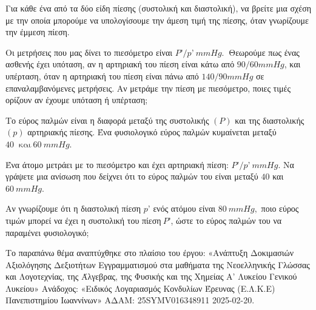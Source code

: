 \begin{alist}
\item Για κάθε ένα από τα δύο είδη πίεσης (συστολική και διαστολική), να βρείτε μια σχέση με την οποία μπορούμε να υπολογίσουμε την άμεση τιμή της πίεσης, όταν γνωρίζουμε την έμμεση πίεση.
\item Οι μετρήσεις που μας δίνει το πιεσόμετρο είναι $P’/p’\ \si{mmHg}.\ $ Θεωρούμε πως ένας ασθενής έχει υπόταση, αν η αρτηριακή του πίεση είναι κάτω από $90/60 \si{mmHg}$, και υπέρταση, όταν η αρτηριακή του πίεση είναι πάνω από $140/90 \si{mmHg}$ σε επαναλαμβανόμενες μετρήσεις. Αν μετράμε την πίεση με πιεσόμετρο, ποιες τιμές ορίζουν αν έχουμε υπόταση ή υπέρταση;

\item Το εύρος παλμών είναι η διαφορά μεταξύ της συστολικής $(P)$ και της διαστολικής $(p)$ αρτηριακής πίεσης. Ένα φυσιολογικό εύρος παλμών κυμαίνεται μεταξύ $40\ \text{ και}\ 60\ mmHg.$
\begin{rlist}
\item
  Ένα άτομο μετράει με το πιεσόμετρο και έχει αρτηριακή πίεση: $P’/p’\ \si{mmHg}.$ Να γράψετε μια ανίσωση που δείχνει ότι το εύρος παλμών του είναι μεταξύ $40$ και $60\ \si{mmHg}.$
\item
  Αν γνωρίζουμε ότι η διαστολική πίεση $p’$ ενός ατόμου είναι $80\ mmHg,$ ποιο εύρος τιμών μπορεί να έχει η συστολική του πίεση$\ P’$, ώστε το εύρος παλμών του να παραμένει φυσιολογικό;
\end{rlist}
{\footnotesize Το παραπάνω θέμα αναπτύχθηκε στο πλαίσιο του έργου: «Ανάπτυξη Δοκιμασιών Αξιολόγησης Δεξιοτήτων Εγγραμματισμού στα μαθήματα της Νεοελληνικής Γλώσσας και Λογοτεχνίας, της Άλγεβρας, της Φυσικής και της Χημείας Α' Λυκείου Γενικού Λυκείου» Ανάδοχος: «Ειδικός Λογαριασμός Κονδυλίων Έρευνας (Ε.Λ.Κ.Ε) Πανεπιστημίου Ιωαννίνων» ΑΔΑΜ: 25SYMV016348911 2025-02-20.}
\end{alist}


